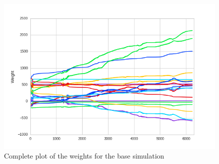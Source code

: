 \begin{figure}[htpb]
  \centering
  \includegraphics[width=\textwidth]{figures/plots/newPlots/base1Training_weights}%
  \caption{ Complete plot of the weights for the base simulation }
  \label{fig:WBase1}
\end{figure}

